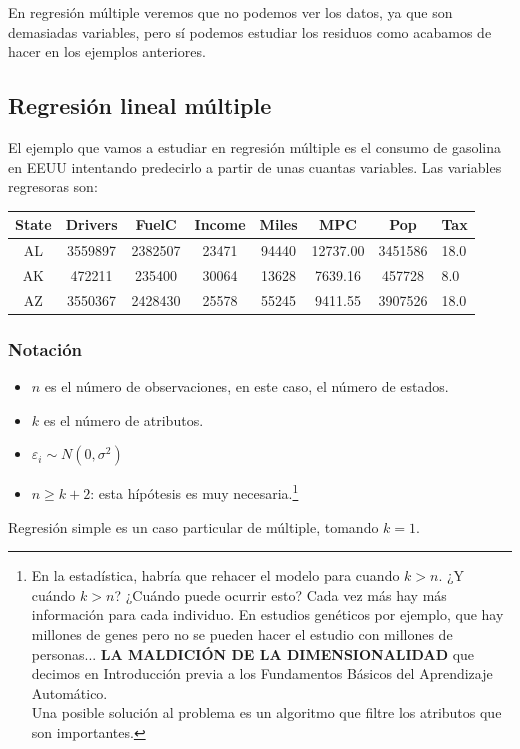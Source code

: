 En regresión múltiple veremos que no podemos ver los datos, ya que son demasiadas variables, pero sí podemos estudiar los residuos como acabamos de hacer en los ejemplos anteriores.

\subsection{Regresión lineal múltiple}

El ejemplo que vamos a estudiar en regresión múltiple es el consumo de gasolina en EEUU intentando predecirlo a partir de unas cuantas variables. Las variables regresoras son:

\begin{center}
\begin{tabular}{ccccccc}
State&Drivers&FuelC&Income&Miles&MPC&Pop&Tax\\\hline
AL&3559897&2382507&23471&94440&12737.00&3451586&18.0\\
AK&472211&235400&30064&13628&7639.16&457728&8.0\\
AZ&3550367&2428430&25578&55245&9411.55&3907526&18.0
\end{tabular}
\end{center}

\subsubsection{Notación}


\begin{itemize}
	\item $n$ es el número de observaciones, en este caso, el número de estados.
	\item $k$ es el número de atributos. 
	\item $ε_i \sim N(0,σ^2)$
	\item $n\geq k+2$: esta hípótesis  es muy necesaria.\footnote{En la estadística, habría que rehacer el modelo para cuando $k>n$. ¿Y cuándo $k>n$? ¿Cuándo puede ocurrir esto? Cada vez más hay más información para cada individuo. En estudios genéticos por ejemplo, que hay millones de genes pero no se pueden hacer el estudio con millones de personas... \textbf{LA MALDICIÓN DE LA DIMENSIONALIDAD} que decimos en Introducción previa a los Fundamentos Básicos del Aprendizaje Automático.\\ Una posible solución al problema es un algoritmo que filtre los atributos que son importantes.}
\end{itemize}

Regresión simple es un caso particular de múltiple, tomando $k=1$.

